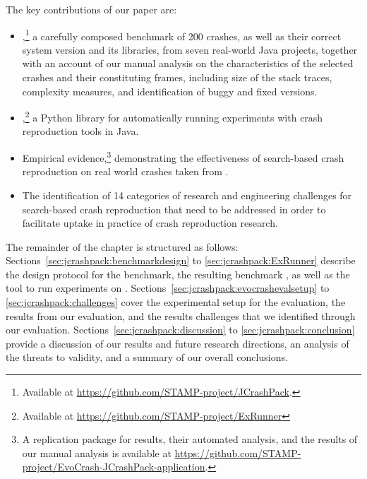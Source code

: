 The key contributions of our paper are:
\begin{itemize}
\item \crashpack,\footnote{Available at \url{https://github.com/STAMP-project/JCrashPack}.} a carefully composed benchmark of 200 crashes, as well as their correct system version and its libraries, from seven real-world Java projects, together with an account of our manual analysis on the characteristics of the selected crashes and their constituting frames, including size of the stack traces, complexity measures, and identification of buggy and fixed versions.

\item \exrunner,\footnote{Available at \url{https://github.com/STAMP-project/ExRunner}} a Python library for automatically running experiments with crash reproduction tools in Java.

\item Empirical evidence,\footnote{A replication package for \evocrash results, their automated analysis, and the results of our manual analysis is available at \url{https://github.com/STAMP-project/EvoCrash-JCrashPack-application}.} demonstrating the effectiveness of search-based crash reproduction on real world crashes taken from \crashpack.

\item The identification of 14 categories of research and engineering challenges for search-based crash reproduction that need to be addressed in order to facilitate uptake in practice of crash reproduction research.

\end{itemize}

The remainder of the chapter is structured as follows:
Sections~\ref{sec:jcrashpack:benchmarkdesign} to \ref{sec:jcrashpack:ExRunner} describe the design protocol for the benchmark, the resulting benchmark \crashpack, as well as the \exrunner tool to run experiments on \crashpack.
Sections~\ref{sec:jcrashpack:evocrashevalsetup} to \ref{sec:jcrashpack:challenges} cover the experimental setup for the \evocrash evaluation, the results from our evaluation, and the results challenges that we identified through our evaluation.
Sections~\ref{sec:jcrashpack:discussion} to \ref{sec:jcrashpack:conclusion} provide a discussion of our results and future research directions, an analysis of the threats to validity, and a summary of our overall conclusions.

